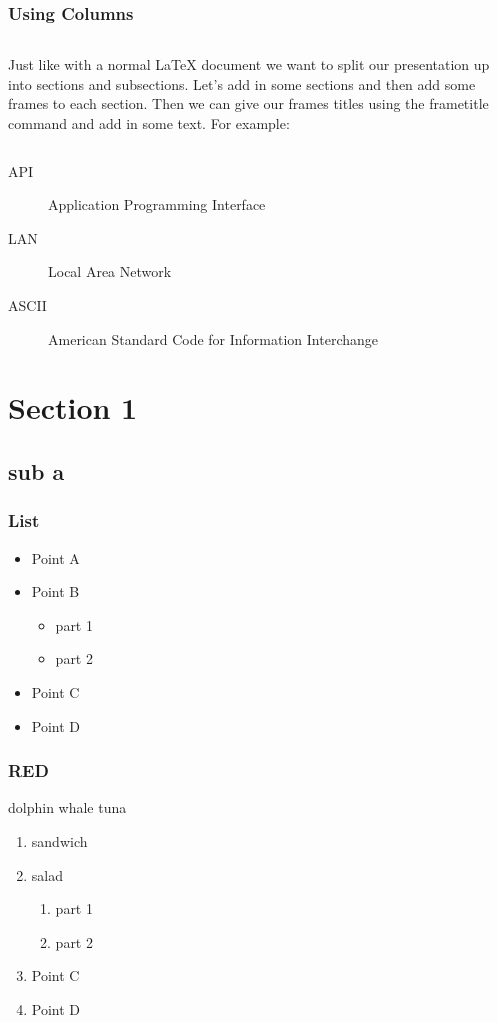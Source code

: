 \begin{frame}
\frametitle{Using Columns}
\begin{columns}
Just like with a normal LaTeX document we want to split our presentation up into sections and subsections.
 Let's add in some sections and then add some frames to each section. Then we can give our frames titles using the frametitle command and add in some text. For example:
\end{columns}
\end{frame}

\begin{description}
\item[API] Application Programming Interface
\item[LAN] Local Area Network
\item[ASCII] American Standard Code for Information Interchange
\end{description}


\tableofcontents

\section{Section 1}
\subsection{sub a}
 
\begin{frame}
\frametitle{List}
\begin{itemize}
\item Point A
\item Point B
\begin{itemize}
\item part 1
\item part 2
\end{itemize}
\item Point C
\item Point D
\end{itemize}
\end{frame}

\begin{frame}
\frametitle{RED}
dolphin
whale
tuna
\end{frame}


\tableofcontents
\begin{enumerate}[I]

\item sandwich
\item salad
\begin{enumerate}[i]
\item part 1
\item part 2
\end{enumerate}
\item Point C
\item Point D
\end{enumerate}

